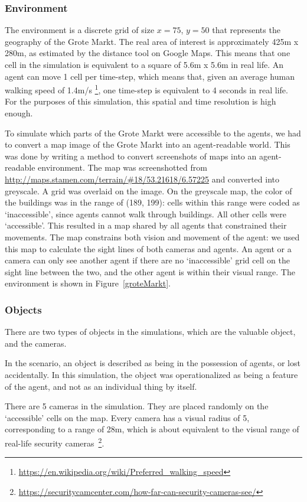 \documentclass[12pt]{article}
\begin{document}
\subsubsection{Environment}

The environment is a discrete grid of size $x=75$, $y = 50$ that represents the geography of the Grote Markt. The real area of interest is approximately 425m x 280m, as estimated by the distance tool on Google Maps. This means that one cell in the simulation is equivalent to a square of 5.6m x 5.6m in real life. An agent can move 1 cell per time-step, which means that, given an average human walking speed of 1.4m/s \footnote{\url{https://en.wikipedia.org/wiki/Preferred_walking_speed}}, one time-step is equivalent to 4 seconds in real life. For the purposes of this simulation, this spatial and time resolution is high enough.

To simulate which parts of the Grote Markt were accessible to the agents, we had to convert a map image of the Grote Markt into an agent-readable world. This was done by writing a method to convert screenshots of maps into an agent-readable environment. The map was screenshotted from \url{http://maps.stamen.com/terrain/#18/53.21618/6.57225} and converted into greyscale. A grid was overlaid on the image. On the greyscale map, the color of the buildings was in the range of (189, 199): cells within this range were coded as `inaccessible', since agents cannot walk through buildings. All other cells were `accessible'. This resulted in a map shared by all agents that constrained their movements. The map constrains both vision and movement of the agent: we used this map to calculate the sight lines of both cameras and agents. An agent or a camera can only see another agent if there are no `inaccessible' grid cell on the sight line between the two, and the other agent is within their visual range. The environment is shown in Figure~\ref{groteMarkt}.
 
 \subsubsection{Objects} 
 There are two types of objects in the simulations, which are the valuable object, and the cameras. 

 In the scenario, an object is described as being in the possession of agents, or lost accidentally. In this simulation, the object was operationalized as being a feature of the agent, and not as an individual thing by itself.
 
 There are 5 cameras in the simulation. They are placed randomly on the `accessible' cells on the map. Every camera has a visual radius of 5, corresponding to a range of 28m, which is about equivalent to the visual range of real-life security cameras~\footnote{\url{https://securitycamcenter.com/how-far-can-security-cameras-see/}}.
 
\end{document}
